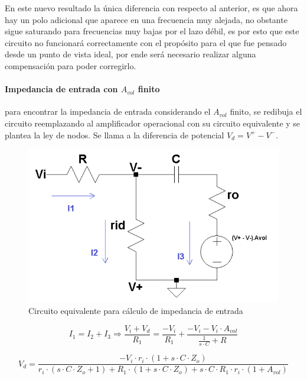En este nuevo resultado la \'unica diferencia con respecto al anterior, es que ahora hay un polo adicional que aparece en una frecuencia muy alejada, no obstante sigue saturando para frecuencias muy bajas por el lazo d\'ebil, es por esto que este circuito no funcionar\'a correctamente con el prop\'osito para el que fue pensado desde un punto de vista ideal, por ende ser\'a necesario realizar alguna compensaci\'on para poder corregirlo.

\paragraph*{Impedancia de entrada con $A_{vol}$ finito} para encontrar la impedancia de entrada considerando el $A_{vol}$ finito, se redibuja el circuito reemplazando al amplificador operacional con su circuito equivalente y se plantea la ley de nodos.
Se llama a la diferencia de potencial $V_d = V^{+} - V^{-}$.

\begin{figure}[H]
	\centering
	\includegraphics[scale=0.7]{Recursos/Integrador/Circuito_integrador_modelo_impedancia.png}
	\caption{Circuito equivalente para c\'alculo de impedancia de entrada}
	\label{fig:integrador_modelo}
\end{figure}

\begin{equation*}
	I_1 = I_2 + I_3 \Rightarrow
	\frac{V_i + V_d}{R_1} = 
	\frac{-V_i}{R_1} + \frac{- V_i - V_i \cdot A_{vol}}{\frac{1}{s \cdot C} + R}
\end{equation*}

\begin{equation*}
	V_d = \frac{- V_i \cdot r_i \cdot ( 1 + s \cdot C \cdot Z_o)}{r_i \cdot(s \cdot C \cdot Z_o + 1) + R_1 \cdot (1 + s \cdot C \cdot Z_o) + s \cdot C \cdot R_1 \cdot r_i \cdot (1 + A_{vol})}
\end{equation*}

